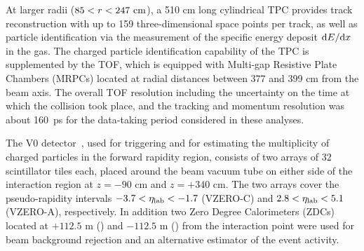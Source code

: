 At larger radii ($85<r<247~\mathrm{cm}$), a 510 cm long cylindrical TPC provides track reconstruction with up to 159 three-dimensional space points per track, as well as particle identification via the measurement of the specific energy deposit ${\rm d}E/{\rm d}x$ in the gas.
The charged particle identification capability of the TPC is supplemented by the TOF, which is equipped with Multi-gap Resistive Plate Chambers  (MRPCs) located at radial distances between 377 and 399 cm from the beam axis. The overall TOF resolution including the uncertainty on the time at which the collision took place, and the tracking and momentum resolution was about 160~ps for the data-taking period considered in these analyses. 

The V0 detector~\cite{Abbas:2013taa}, used for triggering and for estimating the multiplicity of charged particles in the forward rapidity region, consists of two arrays of 32 scintillator tiles each, placed around the beam vacuum tube on either side of the interaction region at $z =-90$ cm and $z=+340$ cm. The two arrays cover the pseudo-rapidity intervals $-3.7 < \eta_{\rm lab} < -1.7$ (VZERO-C) and $2.8 < \eta_{\rm lab} < 5.1$ (VZERO-A), respectively. In addition two Zero Degree Calorimeters (ZDCs) located at $+112.5$ m (\ZNA) and $-112.5$ m (\ZNC) from the interaction point were used for beam background rejection and an alternative estimator of the event activity.


